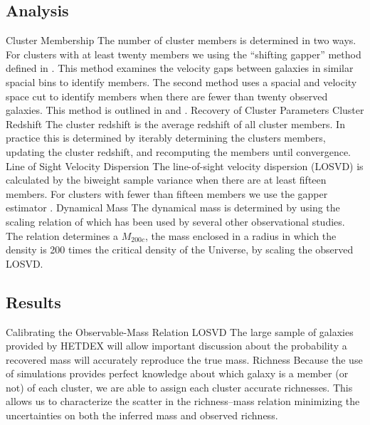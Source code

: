 \documentclass[12pt]{article}
\begin{document}
\subsection{Analysis}
\begin{outline}[enumerate]
	\1 Cluster Membership
		\2 The number of cluster members is determined in two ways. For clusters with at least twenty members we using the ``shifting gapper'' method defined in \cite{Fadda1996}. This method examines the velocity gaps between galaxies in similar spacial bins to identify members. The second method uses a spacial and velocity space cut to identify members when there are fewer than twenty observed galaxies. This method is outlined in \cite{Connelly2012} and \cite{Wilman2005}.
	\1 Recovery of Cluster Parameters
		\2 Cluster Redshift
			\3 The cluster redshift is the average redshift of all cluster members. In practice this is determined by iterably determining the clusters members, updating the cluster redshift, and recomputing the members until convergence.  
		\2 Line of Sight Velocity Dispersion
			\3 The line-of-sight velocity dispersion (LOSVD) is calculated by the biweight sample variance \citep{Ruel2014} when there are at least fifteen members. For clusters with fewer than fifteen members we use the gapper estimator \citep{Beers1990}.
		\2 Dynamical Mass
			\3 The dynamical mass is determined by using the scaling relation of \cite{Munari2013} which has been used by several other observational studies. The relation determines a $M_{200c}$, the mass enclosed in a radius in which the density is 200 times the critical density of the Universe, by scaling the observed LOSVD.
\end{outline}

\subsection{Results}
\begin{outline}[enumerate]
	\1 Calibrating the Observable-Mass Relation
		\2 LOSVD
			\3 The large sample of galaxies provided by HETDEX will allow important discussion about the probability a recovered mass will accurately reproduce the true mass.
		\2 Richness
			\3 Because the use of simulations provides perfect knowledge about which galaxy is a member (or not) of each cluster, we are able to assign each cluster accurate richnesses. This allows us to characterize the scatter in the richness--mass relation minimizing the uncertainties on both the inferred mass and observed richness.   
\end{outline}
\end{document}
